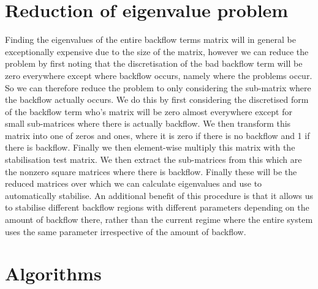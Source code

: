 \section{Reduction of eigenvalue problem}

Finding the eigenvalues of the entire backflow terms matrix will in general be exceptionally expensive due to the size of the matrix, however we can reduce the problem by first noting that the discretisation of the bad backflow term will be zero everywhere except where backflow occurs, namely where the problems occur. So we can therefore reduce the problem to only considering the sub-matrix where the backflow actually occurs. We do this by first considering the discretised form of the backflow term who's matrix will be zero almost everywhere except for small sub-matrices where there is actually backflow. We then transform this matrix into one of zeros and ones, where it is zero if there is no backflow and 1 if there is backflow. Finally we then element-wise multiply this matrix with the stabilisation test matrix. We then extract the sub-matrices from this which are the nonzero square matrices where there is backflow. Finally these will be the reduced matrices over which we can calculate eigenvalues and use to automatically stabilise. An additional benefit of this procedure is that it allows us to stabilise different backflow regions with different parameters depending on the amount of backflow there, rather than the current regime where the entire system uses the same parameter irrespective of the amount of backflow.

\section{Algorithms}